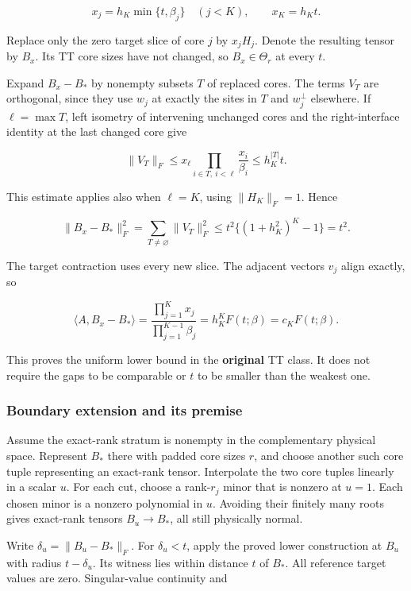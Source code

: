 \documentclass[
  11pt,
]{article}
\begin{document}
\[x_j=h_K\min\{t,\beta_j\}\quad(j<K),\qquad x_K=h_Kt.\]

Replace only the zero target slice of core \(j\) by \(x_jH_j\). Denote
the resulting tensor by \(B_x\). Its TT core sizes have not changed, so
\(B_x\in\Theta_r\) at every \(t\).

Expand \(B_x-B_*\) by nonempty subsets \(T\) of replaced cores. The
terms \(V_T\) are orthogonal, since they use \(w_j\) at exactly the
sites in \(T\) and \(w_j^\perp\) elsewhere. If \(\ell=\max T\), left
isometry of intervening unchanged cores and the right-interface identity
at the last changed core give

\[\|V_T\|_F\le x_\ell\prod_{i\in T,\ i<\ell}\frac{x_i}{\beta_i}
\le h_K^{|T|}t.\]

This estimate applies also when \(\ell=K\), using \(\|H_K\|_F=1\). Hence

\[\|B_x-B_*\|_F^2
=\sum_{T\ne\varnothing}\|V_T\|_F^2
\le t^2\{(1+h_K^2)^K-1\}=t^2.\]

The target contraction uses every new slice. The adjacent vectors
\(v_j\) align exactly, so

\[\langle A,B_x-B_*\rangle
=\frac{\prod_{j=1}^Kx_j}{\prod_{j=1}^{K-1}\beta_j}
=h_K^K F(t;\beta)=c_K F(t;\beta).\]

This proves the uniform lower bound in the \textbf{original} TT class.
It does not require the gaps to be comparable or \(t\) to be smaller
than the weakest one.

\subsubsection{Boundary extension and its
premise}\label{boundary-extension-and-its-premise}

Assume the exact-rank stratum is nonempty in the complementary physical
space. Represent \(B_*\) there with padded core sizes \(r\), and choose
another such core tuple representing an exact-rank tensor. Interpolate
the two core tuples linearly in a scalar \(u\). For each cut, choose a
rank-\(r_j\) minor that is nonzero at \(u=1\). Each chosen minor is a
nonzero polynomial in \(u\). Avoiding their finitely many roots gives
exact-rank tensors \(B_u\to B_*\), all still physically normal.

Write \(\delta_u=\|B_u-B_*\|_F\). For \(\delta_u<t\), apply the proved
lower construction at \(B_u\) with radius \(t-\delta_u\). Its witness
lies within distance \(t\) of \(B_*\). All reference target values are
zero. Singular-value continuity and
\end{document}
